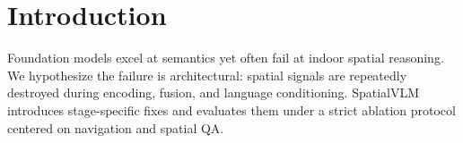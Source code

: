 \section{Introduction}
Foundation models excel at semantics yet often fail at indoor spatial reasoning. We hypothesize the
failure is architectural: spatial signals are repeatedly destroyed during encoding, fusion, and
language conditioning. SpatialVLM introduces stage-specific fixes and evaluates them under a strict
ablation protocol centered on navigation and spatial QA.
